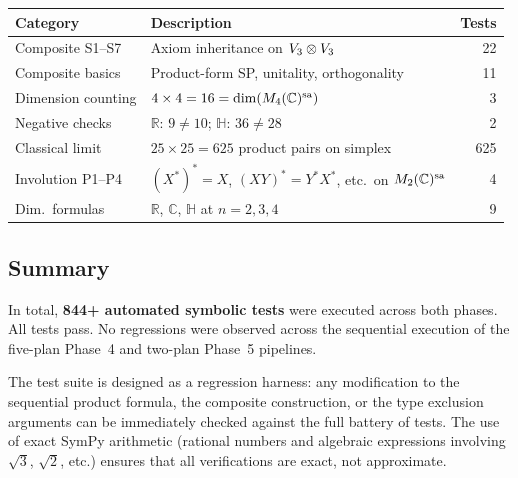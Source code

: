 \begin{center}
\begin{tabular}{@{}llr@{}}
\toprule
Category & Description & Tests \\
\midrule
Composite S1--S7 & Axiom inheritance on $V_{3}
                    \otimes V_{3}$ & 22 \\
Composite basics  & Product-form SP, unitality, orthogonality & 11 \\
Dimension counting & $4 \times 4 = 16 = \dim(M_{4}(\mathbb{C})^{\mathrm{sa}})$ & 3 \\
Negative checks    & $\mathbb{R}$: $9 \neq 10$;
                     $\mathbb{H}$: $36 \neq 28$ & 2 \\
Classical limit    & $25 \times 25 = 625$ product pairs on simplex & 625 \\
Involution P1--P4  & $(X^{*})^{*} = X$, $(XY)^{*} = Y^{*}X^{*}$,
                     etc.\ on $M_{2}(\mathbb{C})^{\mathrm{sa}}$ & 4 \\
Dim.\ formulas     & $\mathbb{R}$, $\mathbb{C}$, $\mathbb{H}$
                     at $n = 2, 3, 4$ & 9 \\
\bottomrule
\end{tabular}
\end{center}

\subsection{Summary}

In total, \textbf{844+ automated symbolic tests} were executed across
both phases.  All tests pass.  No regressions were observed across the
sequential execution of the five-plan Phase~4 and two-plan Phase~5
pipelines.

The test suite is designed as a regression harness: any modification
to the sequential product formula, the composite construction, or the
type exclusion arguments can be immediately checked against the full
battery of tests.  The use of exact SymPy arithmetic (rational numbers
and algebraic expressions involving $\sqrt{3}$, $\sqrt{2}$, etc.)
ensures that all verifications are exact, not approximate.
